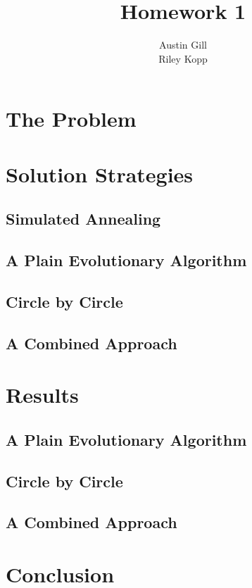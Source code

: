 \documentclass{article}
\title{Homework 1}
\author{Austin Gill \\ Riley Kopp}
\begin{document}
\maketitle
\begingroup
\hypersetup{linkcolor=black}
\tableofcontents
\endgroup
\newpage

\section{The Problem}\label{sec:problem}

\section{Solution Strategies}\label{sec:strategies}

\subsection{Simulated Annealing}\label{sec:strat:simulated-annealing}
\subsection{A Plain Evolutionary Algorithm}\label{sec:strat:evolutionary-algorithm}
\subsection{Circle by Circle}\label{sec:strat:circle-by-circle}
\subsection{A Combined Approach}\label{sec:strat:combined-approach}

\section{Results}\label{sec:results}

\subsection{A Plain Evolutionary Algorithm}\label{sec:results:evolutionary-algorithm}
\subsection{Circle by Circle}\label{sec:results:circle-by-circle}
\subsection{A Combined Approach}\label{sec:results:combined-approach}

\section{Conclusion}
\end{document}
